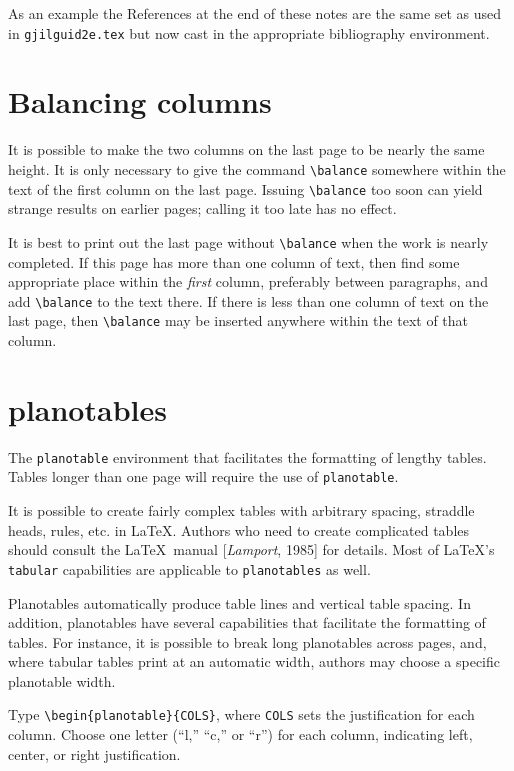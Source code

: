 \documentclass[extra,mreferee]{gji}
\begin{document}
As an example the References at the end of these notes are
the same set as used in \verb"gjilguid2e.tex"
but now cast in the appropriate bibliography environment.

\section{Balancing columns}
It is possible to make the two columns on the last page to be nearly the
same height. It is only necessary to give the command \verb!\balance!
somewhere within the text of the first column on the last page. Issuing
\verb!\balance! too soon can yield strange results on earlier pages;
calling it too late has no effect.

It is best to print out the last page without \verb!\balance! when the
work is nearly completed. If this page has more than one column of text,
then find some appropriate place within the {\em first\/} column,
preferably between paragraphs, and add \verb!\balance! to the text there.
If there is less than one column of text on the last page, then
\verb!\balance! may be inserted anywhere within the text of that column.

\section{planotables}
The {\tt planotable} environment that facilitates the 
formatting of lengthy tables. Tables longer than 
one page will require the use of {\tt planotable}.

It is possible to create fairly complex tables with 
arbitrary spacing, straddle heads, rules, etc. in \LaTeX.
Authors who need to create complicated tables should 
consult the \LaTeX\ manual [{\it Lamport}, 1985] for 
details.  Most of \LaTeX's {\tt tabular} capabilities 
are applicable to {\tt planotables} as well.

Planotables automatically produce table lines and
vertical table spacing.
In addition, planotables have several capabilities that 
facilitate the formatting of tables.  For instance, 
it is possible to break long planotables across pages, 
and, where tabular tables print at an automatic width,
authors may choose a specific planotable width.

Type \verb"\begin{planotable}{COLS}", 
where {\tt COLS}
sets the justification for each column.
Choose one letter (``l,'' ``c,'' or ``r'') for each 
column, indicating left, center, or right justification.
\end{document}

